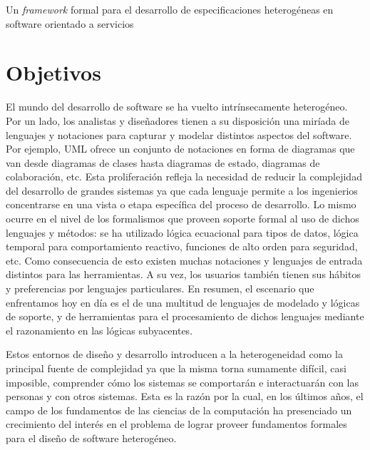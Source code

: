 \documentclass[a4paper, 11pt]{article}
\begin{document}
\begin{Large}
 \begin{center}
    Un \emph{framework} formal para el desarrollo de especificaciones heterogéneas en software orientado a servicios
 \end{center}

\end{Large}


\section{Objetivos}
  El mundo del desarrollo de software se ha vuelto intrínsecamente heterogéneo. Por un lado, los analistas y diseñadores tienen a su disposición una miríada de lenguajes y notaciones para capturar y modelar distintos aspectos del software. Por ejemplo, UML \cite{omg-sysml04,omg-ocl04} ofrece un conjunto de notaciones en forma de diagramas que van desde diagramas de clases hasta diagramas de estado, diagramas de colaboración, etc. Esta proliferación refleja la necesidad de reducir la complejidad del desarrollo de grandes sistemas ya que cada lenguaje permite a los ingenierios concentrarse en una vista o etapa específica del proceso de desarrollo. Lo mismo ocurre en el nivel de los formalismos que proveen soporte formal al uso de dichos lenguajes y métodos: se ha utilizado lógica ecuacional para tipos de datos, lógica temporal para comportamiento reactivo, funciones de alto orden para seguridad, etc. Como consecuencia de esto existen muchas notaciones y lenguajes de entrada distintos para las herramientas. A su vez, los usuarios también tienen sus hábitos y preferencias por lenguajes particulares. En resumen, el escenario que enfrentamos hoy en día es el de una multitud de lenguajes de modelado y lógicas de soporte, y de herramientas para el procesamiento de dichos lenguajes mediante el razonamiento en las lógicas subyacentes.
  
  Estos entornos de diseño y desarrollo introducen a la heterogeneidad como la principal fuente de complejidad ya que la misma torna sumamente difícil, casi imposible, comprender cómo los sistemas se comportarán e interactuarán con las personas y con otros sistemas. Esta es la razón por la cual, en los últimos años, el campo de los fundamentos de las ciencias de la computación ha presenciado un crecimiento del interés en el problema de lograr proveer fundamentos formales para el diseño de software heterogéneo.
  
\end{document}
